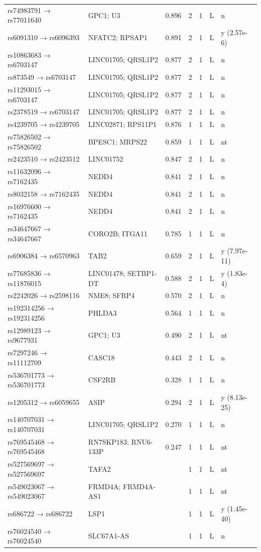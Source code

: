 \documentclass[10pt,twocolumn,a4paper]{article}
\begin{document}
{\begin{longtable}{@{}l>{\raggedright\arraybackslash}p{5.2cm}rcccl@{}}
rs74983791 → rs77011640 & GPC1; U3 & 0.896 & 2 & 1 & L & n \\
rs6091310 → rs6096393 & NFATC2; RPSAP1 & 0.891 & 2 & 1 & L & y (2.57e-6) \\
rs10863683 → rs6703147 & LINC01705; QRSL1P2 & 0.877 & 2 & 1 & L & n \\
rs873549 → rs6703147 & LINC01705; QRSL1P2 & 0.877 & 2 & 1 & L & n \\
rs11293015 → rs6703147 & LINC01705; QRSL1P2 & 0.877 & 2 & 1 & L & n \\
rs2378519 → rs6703147 & LINC01705; QRSL1P2 & 0.877 & 2 & 1 & L & n \\
rs4239705 → rs4239705 & LINC02871; RPS11P1 & 0.876 & 1 & 1 & L & n \\
rs75826502 → rs75826502 & BPESC1; MRPS22 & 0.859 & 1 & 1 & L & nt \\
rs2423510 → rs2423512 & LINC01752 & 0.847 & 2 & 1 & L & n \\
rs11632096 → rs7162435 & NEDD4 & 0.841 & 2 & 1 & L & n \\
rs8032158 → rs7162435 & NEDD4 & 0.841 & 2 & 1 & L & n \\
rs16976600 → rs7162435 & NEDD4 & 0.841 & 2 & 1 & L & n \\
rs34647667 → rs34647667 & CORO2B; ITGA11 & 0.785 & 1 & 1 & L & n \\
rs6906384 → rs6570963 & TAB2 & 0.659 & 2 & 1 & L & y (7.97e-11) \\
rs77685836 → rs11876015 & LINC01478; SETBP1-DT & 0.588 & 2 & 1 & L & y (1.83e-4) \\
rs2242026 → rs2598116 & NME8; SFRP4 & 0.570 & 2 & 1 & L & n \\
rs192314256 → rs192314256 & PHLDA3 & 0.564 & 1 & 1 & L & n \\
rs12989123 → rs9677931 & GPC1; U3 & 0.490 & 2 & 1 & L & nt \\
rs7297246 → rs11112709 & CASC18 & 0.443 & 2 & 1 & L & n \\
rs536701773 → rs536701773 & CSF2RB & 0.328 & 1 & 1 & L & n \\
rs1205312 → rs6059655 & ASIP & 0.294 & 2 & 1 & L & y (8.13e-25) \\
rs140707031 → rs140707031 & LINC01705; QRSL1P2 & 0.270 & 1 & 1 & L & n \\
rs769545468 → rs769545468 & RN7SKP183; RNU6-133P & 0.247 & 1 & 1 & L & nt \\
rs527569697 → rs527569697 & TAFA2 &  & 1 & 1 & L & nt \\
rs549023067 → rs549023067 & FRMD4A; FRMD4A-AS1 &  & 1 & 1 & L & nt \\
rs686722 → rs686722 & LSP1 &  & 1 & 1 & L & y (1.45e-40) \\
rs76024540 → rs76024540 & SLC67A1-AS &  & 1 & 1 & L & n \\
\end{longtable}}
\end{document}
